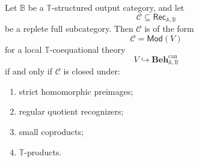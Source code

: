\begin{theorem}
\label{thm:T-coequational-birkhoff}
    Let \(\mathbb B\) be a \(\mathbb T\)-structured output category, and let
    \[
        \mathcal C\subseteq\mathsf{Rec}_{\mathbb A,\mathbb B}
    \]
    be a replete full subcategory. Then \(\mathcal C\) is of the form
    \[
        \mathcal C=\mathsf{Mod}(V)
    \]
    for a local \(\mathbb T\)-coequational theory
    \[
        V\hookrightarrow\mathbf{Beh}^{\mathrm{can}}_{\mathbb A,\mathbb B}
    \]
    if and only if \(\mathcal C\) is closed under:
    \begin{enumerate}
        \item strict homomorphic preimages;
        \item regular quotient recognizers;
        \item small coproducts;
        \item \(\mathbb T\)-products.
    \end{enumerate}
\end{theorem}

